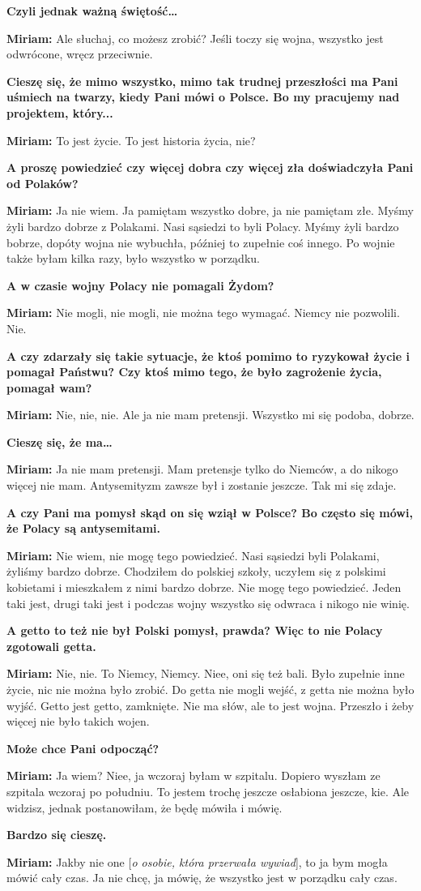 \textbf{Czyli jednak ważną świętość…}

\textbf{Miriam:} Ale słuchaj, co możesz zrobić? Jeśli toczy się wojna, wszystko jest odwrócone, wręcz przeciwnie.

\textbf{Cieszę się, że mimo wszystko, mimo tak trudnej przeszłości ma Pani uśmiech na twarzy, kiedy Pani mówi o Polsce. Bo my pracujemy nad projektem, który...}

\textbf{Miriam:} To jest życie. To jest historia życia, nie? 

\textbf{A proszę powiedzieć czy więcej dobra czy więcej zła doświadczyła Pani od Polaków?} 

\textbf{Miriam:} Ja nie wiem. Ja pamiętam wszystko dobre, ja nie pamiętam złe. Myśmy żyli bardzo dobrze z Polakami. Nasi sąsiedzi to byli Polacy. Myśmy żyli bardzo bobrze, dopóty wojna nie wybuchła, później to zupełnie coś innego. Po wojnie także byłam kilka razy, było wszystko w porządku. 

\textbf{A w czasie wojny Polacy nie pomagali Żydom?} 

\textbf{Miriam:} Nie mogli, nie mogli, nie można tego wymagać. Niemcy nie pozwolili. Nie. 

\textbf{A czy zdarzały się takie sytuacje, że ktoś pomimo to ryzykował życie i pomagał Państwu? Czy ktoś mimo tego, że było zagrożenie życia, pomagał wam?} 

\textbf{Miriam:} Nie, nie, nie. Ale ja nie mam pretensji. Wszystko mi się podoba, dobrze.  

\textbf{Cieszę się, że ma…}

\textbf{Miriam:} Ja nie mam pretensji. Mam pretensje tylko do Niemców, a do nikogo więcej nie mam. Antysemityzm zawsze był i zostanie jeszcze. Tak mi się zdaje. 

\textbf{A czy Pani ma pomysł skąd on się wziął w Polsce? Bo często się mówi, że Polacy są antysemitami.}

\textbf{Miriam:} Nie wiem, nie mogę tego powiedzieć. Nasi sąsiedzi byli Polakami, żyliśmy bardzo dobrze. Chodziłem do polskiej szkoły, uczyłem się z polskimi kobietami i mieszkałem z nimi bardzo dobrze. Nie mogę tego powiedzieć. Jeden taki jest, drugi taki jest i podczas wojny wszystko się odwraca i nikogo nie winię.

\textbf{A getto to też nie był Polski pomysł, prawda? Więc to nie Polacy zgotowali getta.} 

\textbf{Miriam:} Nie, nie. To Niemcy, Niemcy. Niee, oni się też bali. Było zupełnie inne życie, nic nie można było zrobić. Do getta nie mogli wejść, z getta nie można było wyjść. Getto jest getto, zamknięte. Nie ma słów, ale to jest wojna. Przeszło i żeby więcej nie było takich wojen. 

\textbf{Może chce Pani odpocząć?}

\textbf{Miriam:} Ja wiem? Niee, ja wczoraj byłam w szpitalu. Dopiero wyszłam ze szpitala wczoraj po południu. To jestem trochę jeszcze osłabiona jeszcze, kie. Ale widzisz, jednak postanowiłam, że będę mówiła i mówię. 

\textbf{Bardzo się cieszę.} 

\textbf{Miriam:} Jakby nie one [\textit{o osobie, która przerwała wywiad}], to ja bym mogła mówić cały czas. Ja nie chcę, ja mówię, że wszystko jest w porządku cały czas.  